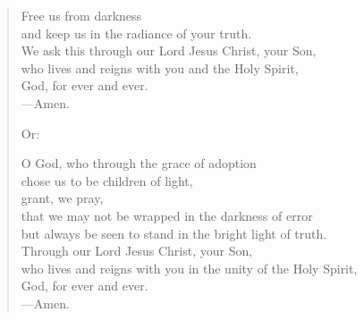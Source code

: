 \prayer

\setlength{\vleftmargin}{\prayerleftmargini}

\begin{verse}
Free us from darkness\\
and keep us in the radiance of your truth.\\
We ask this through our Lord Jesus Christ, your Son,\\
who lives and reigns with you and the Holy Spirit,\\
God, for ever and ever.\\
{\color{red}---\thinspace}Amen.

{\color{red}Or:}

O God, who through the grace of adoption\\
chose us to be children of light,\\
grant, we pray,\\
that we may not be wrapped in the darkness of error\\
but always be seen to stand in the bright light of truth.\\
Through our Lord Jesus Christ, your Son,\\
who lives and reigns with you in the unity of the Holy Spirit,\\
God, for ever and ever.\\
{\color{red}---\thinspace}Amen.
\end{verse}

\setlength{\vleftmargin}{\defleftmargini}